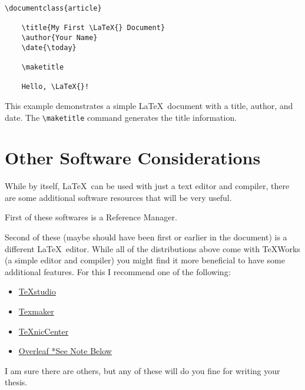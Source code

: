 		\begin{lstlisting}[style=LaTeXStyle]
\documentclass{article}

    \title{My First \LaTeX{} Document}
    \author{Your Name}
    \date{\today}
    
    \maketitle
    
    Hello, \LaTeX{}!

		\end{lstlisting}
		This example demonstrates a simple \LaTeX\ document with a title, author, and date. 
		The \lstinline|\maketitle| command generates the title information.

	\section{Other Software Considerations}
		While by itself, \LaTeX\ can be used with just a text editor and compiler, there are some additional software resources that will be very useful.
		
		First of these softwares is a Reference Manager.
		
		
		Second of these (maybe should have been first or earlier in the document) is a different \LaTeX\ editor.
		While all of the distributions above come with TeXWorks (a simple editor and compiler) you might find it more beneficial to have some additional features.
		For this I recommend one of the following:
		\begin{itemize}
			\item \href{https://www.texstudio.org/}{TeXstudio}
			\item \href{http://www.xm1math.net/texmaker/}{Texmaker}
			\item \href{http://www.texniccenter.org/}{TeXnicCenter}
			\item \href{https://www.overleaf.com/}{Overleaf *See Note Below}
		\end{itemize}
		I am sure there are others, but any of these will do you fine for writing your thesis.
		

